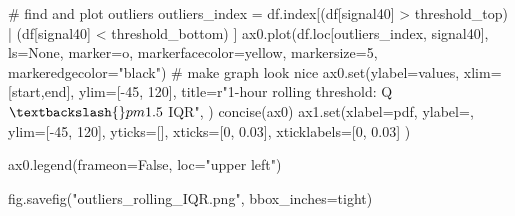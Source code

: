 \documentclass[
  letterpaper,
  DIV=11,
  numbers=noendperiod,
  oneside]{scrreprt}
\newenvironment{Shaded}{\begin{snugshade}}{\end{snugshade}}
\newcommand{\BuiltInTok}[1]{\textcolor[rgb]{0.00,0.23,0.31}{#1}}
\newcommand{\CommentTok}[1]{\textcolor[rgb]{0.37,0.37,0.37}{#1}}
\newcommand{\DecValTok}[1]{\textcolor[rgb]{0.68,0.00,0.00}{#1}}
\newcommand{\FloatTok}[1]{\textcolor[rgb]{0.68,0.00,0.00}{#1}}
\newcommand{\NormalTok}[1]{\textcolor[rgb]{0.00,0.23,0.31}{#1}}
\newcommand{\OperatorTok}[1]{\textcolor[rgb]{0.37,0.37,0.37}{#1}}
\newcommand{\StringTok}[1]{\textcolor[rgb]{0.13,0.47,0.30}{#1}}
\newcommand{\VariableTok}[1]{\textcolor[rgb]{0.07,0.07,0.07}{#1}}
\newcommand{\VerbatimStringTok}[1]{\textcolor[rgb]{0.13,0.47,0.30}{#1}}
\begin{document}
\begin{Shaded}
\begin{Highlighting}[]
\CommentTok{\# find and plot outliers}
\NormalTok{outliers\_index }\OperatorTok{=}\NormalTok{ df.index[(df[}\StringTok{\textquotesingle{}signal40\textquotesingle{}}\NormalTok{] }\OperatorTok{\textgreater{}}\NormalTok{ threshold\_top) }\OperatorTok{|} 
\NormalTok{                          (df[}\StringTok{\textquotesingle{}signal40\textquotesingle{}}\NormalTok{] }\OperatorTok{\textless{}}\NormalTok{ threshold\_bottom)}
\NormalTok{                         ]}
\NormalTok{ax0.plot(df.loc[outliers\_index, }\StringTok{\textquotesingle{}signal40\textquotesingle{}}\NormalTok{], ls}\OperatorTok{=}\StringTok{\textquotesingle{}None\textquotesingle{}}\NormalTok{,}
\NormalTok{        marker}\OperatorTok{=}\StringTok{\textquotesingle{}o\textquotesingle{}}\NormalTok{, markerfacecolor}\OperatorTok{=}\StringTok{\textquotesingle{}yellow\textquotesingle{}}\NormalTok{, markersize}\OperatorTok{=}\DecValTok{5}\NormalTok{,}
\NormalTok{        markeredgecolor}\OperatorTok{=}\StringTok{"black"}\NormalTok{)}
\CommentTok{\# make graph look nice}
\NormalTok{ax0.}\BuiltInTok{set}\NormalTok{(ylabel}\OperatorTok{=}\StringTok{\textquotesingle{}values\textquotesingle{}}\NormalTok{,}
\NormalTok{       xlim}\OperatorTok{=}\NormalTok{[start,end],}
\NormalTok{       ylim}\OperatorTok{=}\NormalTok{[}\OperatorTok{{-}}\DecValTok{45}\NormalTok{, }\DecValTok{120}\NormalTok{],}
\NormalTok{       title}\OperatorTok{=}\VerbatimStringTok{r"1{-}hour rolling threshold: Q $\textbackslash{}pm1.5$ IQR"}\NormalTok{,}
\NormalTok{       )}
\NormalTok{concise(ax0)}
\NormalTok{ax1.}\BuiltInTok{set}\NormalTok{(xlabel}\OperatorTok{=}\StringTok{\textquotesingle{}pdf\textquotesingle{}}\NormalTok{,}
\NormalTok{        ylabel}\OperatorTok{=}\StringTok{\textquotesingle{}\textquotesingle{}}\NormalTok{,}
\NormalTok{        ylim}\OperatorTok{=}\NormalTok{[}\OperatorTok{{-}}\DecValTok{45}\NormalTok{, }\DecValTok{120}\NormalTok{],}
\NormalTok{        yticks}\OperatorTok{=}\NormalTok{[],}
\NormalTok{        xticks}\OperatorTok{=}\NormalTok{[}\DecValTok{0}\NormalTok{, }\FloatTok{0.03}\NormalTok{],}
\NormalTok{        xticklabels}\OperatorTok{=}\NormalTok{[}\StringTok{\textquotesingle{}0\textquotesingle{}}\NormalTok{, }\StringTok{\textquotesingle{}0.03\textquotesingle{}}\NormalTok{]}
\NormalTok{        )}

\NormalTok{ax0.legend(frameon}\OperatorTok{=}\VariableTok{False}\NormalTok{, loc}\OperatorTok{=}\StringTok{"upper left"}\NormalTok{)}


\NormalTok{fig.savefig(}\StringTok{"outliers\_rolling\_IQR.png"}\NormalTok{, bbox\_inches}\OperatorTok{=}\StringTok{\textquotesingle{}tight\textquotesingle{}}\NormalTok{)}
\end{Highlighting}
\end{Shaded}
\end{document}
